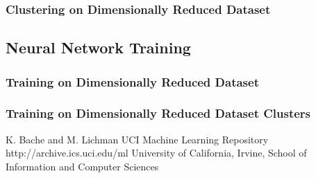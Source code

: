 \documentclass{sig-alternate}
\begin{document}
\subsubsection{Clustering on Dimensionally Reduced Dataset}



\subsection{Neural Network Training}


\subsubsection{Training on Dimensionally Reduced Dataset}


\subsubsection{Training on Dimensionally Reduced Dataset Clusters}







\begin{thebibliography}{10}

K. Bache and M. Lichman
\newblock UCI Machine Learning Repository
\newblock http://archive.ics.uci.edu/ml
\newblock University of California, Irvine, School of Information and Computer Sciences


\end{thebibliography}
\end{document}
